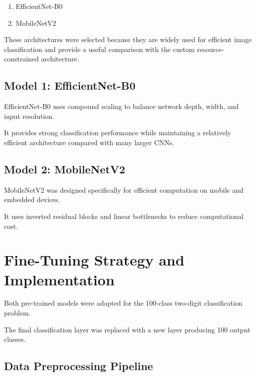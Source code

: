\documentclass[12pt,a4paper]{report}
\begin{document}
\begin{enumerate}
    \item EfficientNet-B0
    \item MobileNetV2
\end{enumerate}

These architectures were selected because they are widely used
for efficient image classification and provide a useful
comparison with the custom resource-constrained architecture.

\subsection{Model 1: EfficientNet-B0}

EfficientNet-B0 uses compound scaling to balance network depth,
width, and input resolution.

It provides strong classification performance while maintaining
a relatively efficient architecture compared with many larger
CNNs.

\subsection{Model 2: MobileNetV2}

MobileNetV2 was designed specifically for efficient computation
on mobile and embedded devices.

It uses inverted residual blocks and linear bottlenecks to reduce
computational cost.

\section{Fine-Tuning Strategy and Implementation}

Both pre-trained models were adapted for the 100-class
two-digit classification problem.

The final classification layer was replaced with a new layer
producing 100 output classes.

\subsection{Data Preprocessing Pipeline}
\end{document}
